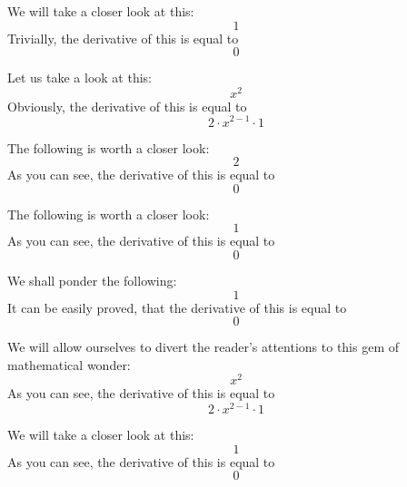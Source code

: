 \documentclass{article}
\begin{document}
We will take a closer look at this:
\begin{equation}
1 
\end{equation}
Trivially, the derivative of this is equal to
\begin{equation}
0 
\end{equation}

Let us take a look at this:
\begin{equation}
x ^{2 } 
\end{equation}
Obviously, the derivative of this is equal to
\begin{equation}
2 \cdot x ^{2 - 1 } \cdot 1 
\end{equation}

The following is worth a closer look:
\begin{equation}
2 
\end{equation}
As you can see, the derivative of this is equal to
\begin{equation}
0 
\end{equation}

The following is worth a closer look:
\begin{equation}
1 
\end{equation}
As you can see, the derivative of this is equal to
\begin{equation}
0 
\end{equation}

We shall ponder the following:
\begin{equation}
1 
\end{equation}
It can be easily proved, that the derivative of this is equal to
\begin{equation}
0 
\end{equation}

We will allow ourselves to divert the reader's attentions to this gem of mathematical wonder:
\begin{equation}
x ^{2 } 
\end{equation}
As you can see, the derivative of this is equal to
\begin{equation}
2 \cdot x ^{2 - 1 } \cdot 1 
\end{equation}

We will take a closer look at this:
\begin{equation}
1 
\end{equation}
As you can see, the derivative of this is equal to
\begin{equation}
0 
\end{equation}
\end{document}
